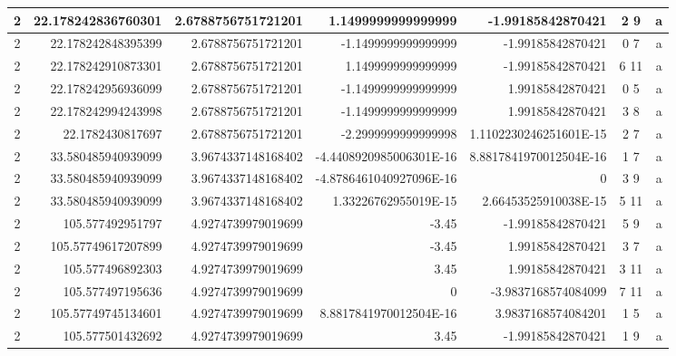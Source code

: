 \begin{table}
\begin{tabular*}{\textwidth}{ | c | r | r | r | r | c | c | }
	2 & 22.178242836760301 & 2.6788756751721201 & 1.1499999999999999 & -1.99185842870421 & 2 9 & a \\ \hline
	2 & 22.178242848395399 & 2.6788756751721201 & -1.1499999999999999 & -1.99185842870421 & 0 7 & a \\ \hline
	2 & 22.178242910873301 & 2.6788756751721201 & 1.1499999999999999 & -1.99185842870421 & 6 11 & a \\ \hline
	2 & 22.178242956936099 & 2.6788756751721201 & -1.1499999999999999 & 1.99185842870421 & 0 5 & a \\ \hline
	2 & 22.178242994243998 & 2.6788756751721201 & -1.1499999999999999 & 1.99185842870421 & 3 8 & a \\ \hline
	2 & 22.1782430817697 & 2.6788756751721201 & -2.2999999999999998 & 1.1102230246251601E-15 & 2 7 & a \\ \hline
	2 & 33.580485940939099 & 3.9674337148168402 & -4.4408920985006301E-16 & 8.8817841970012504E-16 & 1 7 & a \\ \hline
	2 & 33.580485940939099 & 3.9674337148168402 & -4.8786461040927096E-16 & 0 & 3 9 & a \\ \hline
	2 & 33.580485940939099 & 3.9674337148168402 & 1.33226762955019E-15 & 2.66453525910038E-15 & 5 11 & a \\ \hline
	2 & 105.577492951797 & 4.9274739979019699 & -3.45 & -1.99185842870421 & 5 9 & a \\ \hline
	2 & 105.57749617207899 & 4.9274739979019699 & -3.45 & 1.99185842870421 & 3 7 & a \\ \hline
	2 & 105.577496892303 & 4.9274739979019699 & 3.45 & 1.99185842870421 & 3 11 & a \\ \hline
	2 & 105.577497195636 & 4.9274739979019699 & 0 & -3.9837168574084099 & 7 11 & a \\ \hline
	2 & 105.57749745134601 & 4.9274739979019699 & 8.8817841970012504E-16 & 3.9837168574084201 & 1 5 & a \\ \hline
	2 & 105.577501432692 & 4.9274739979019699 & 3.45 & -1.99185842870421 & 1 9 & a \\ \hline
\end{tabular*}

\label{tabListLength3}
\end{table}